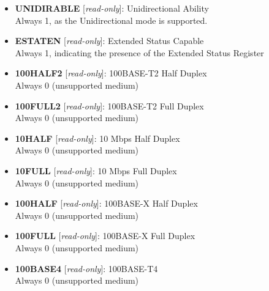 \begin{itemize}
\item \begin{small}
{\bf 
UNIDIRABLE
} [\emph{read-only}]: Unidirectional Ability
\\
Always 1, as the Unidirectional mode is supported. 
\end{small}
\item \begin{small}
{\bf 
ESTATEN
} [\emph{read-only}]: Extended Status Capable
\\
Always 1, indicating the presence of the Extended Status Register
\end{small}
\item \begin{small}
{\bf 
100HALF2
} [\emph{read-only}]: 100BASE-T2 Half Duplex
\\
Always 0 (unsupported medium)
\end{small}
\item \begin{small}
{\bf 
100FULL2
} [\emph{read-only}]: 100BASE-T2 Full Duplex
\\
Always 0 (unsupported medium)
\end{small}
\item \begin{small}
{\bf 
10HALF
} [\emph{read-only}]: 10 Mbps Half Duplex
\\
Always 0 (unsupported medium)
\end{small}
\item \begin{small}
{\bf 
10FULL
} [\emph{read-only}]: 10 Mbps Full Duplex
\\
Always 0 (unsupported medium)
\end{small}
\item \begin{small}
{\bf 
100HALF
} [\emph{read-only}]: 100BASE-X Half Duplex
\\
Always 0 (unsupported medium)
\end{small}
\item \begin{small}
{\bf 
100FULL
} [\emph{read-only}]: 100BASE-X Full Duplex
\\
Always 0 (unsupported medium)
\end{small}
\item \begin{small}
{\bf 
100BASE4
} [\emph{read-only}]: 100BASE-T4
\\
Always 0 (unsupported medium)
\end{small}
\end{itemize}
